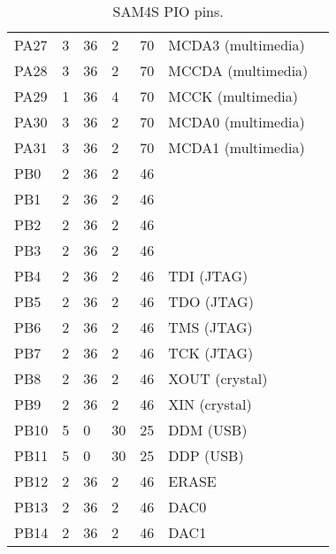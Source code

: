 \begin{table}
\begin{tabular}{lllllll}
    PA27    &  3 & 36 &  2 & 70 & MCDA3 (multimedia)      \\
    PA28    &  3 & 36 &  2 & 70 & MCCDA (multimedia)      \\
    PA29    &  1 & 36 &  4 & 70 & MCCK (multimedia)       \\
    PA30    &  3 & 36 &  2 & 70 & MCDA0 (multimedia)      \\
    PA31    &  3 & 36 &  2 & 70 & MCDA1 (multimedia)      \\
    PB0     &  2 & 36 &  2 & 46 &       \\
    PB1     &  2 & 36 &  2 & 46 &       \\
    PB2     &  2 & 36 &  2 & 46 &       \\
    PB3     &  2 & 36 &  2 & 46 &       \\
    PB4     &  2 & 36 &  2 & 46 & TDI (JTAG)      \\
    PB5     &  2 & 36 &  2 & 46 & TDO (JTAG)     \\
    PB6     &  2 & 36 &  2 & 46 & TMS (JTAG)     \\
    PB7     &  2 & 36 &  2 & 46 & TCK (JTAG)     \\
    PB8     &  2 & 36 &  2 & 46 & XOUT (crystal)    \\
    PB9     &  2 & 36 &  2 & 46 & XIN  (crystal)    \\
    PB10    &  5 & 0  & 30 & 25 & DDM (USB)       \\
    PB11    &  5 & 0  & 30 & 25 & DDP (USB)      \\
    PB12    &  2 & 36 &  2 & 46 & ERASE      \\
    PB13    &  2 & 36 &  2 & 46 & DAC0      \\
    PB14    &  2 & 36 &  2 & 46 & DAC1      \\
  \end{tabular}
  \caption{SAM4S PIO pins.}
  \label{tab:pio-pins}
\end{table}
